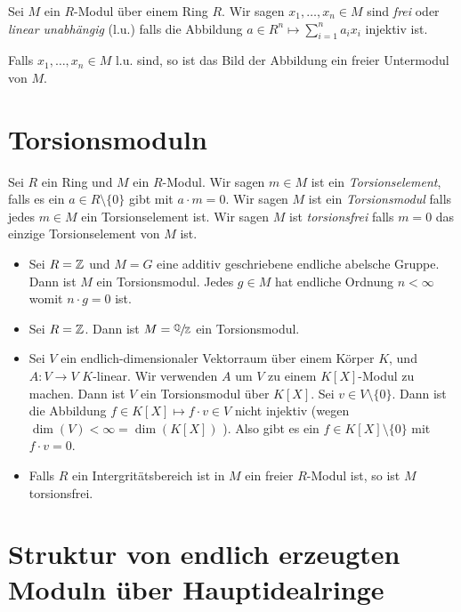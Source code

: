 \begin{definition}
	Sei $M$ ein $ R$-Modul über einem Ring $R$. Wir sagen $x_1,\ldots,x_{n} \in M$ sind \emph{frei} oder \emph{linear unabhängig} (l.u.) falls die Abbildung
	$a \in R^{n} \mapsto \sum_{i = 1}^{n} a_{i} x_{i}$ injektiv ist.

	Falls $x_1,\ldots,x_{n} \in M$ l.u. sind, so ist das Bild der Abbildung ein freier Untermodul von $M$.
\end{definition}

\section{Torsionsmoduln}
\begin{definition}
	Sei $R$ ein Ring und $M$ ein $R$-Modul. Wir sagen $m \in M$ ist ein \emph{Torsionselement}, falls es ein $a \in R \setminus \{0\} $ gibt
	mit $a \cdot m = 0$. Wir sagen $M$ ist ein \emph{Torsionsmodul} falls jedes $m \in M$ ein Torsionselement ist.
	Wir sagen $M$ ist \emph{torsionsfrei} falls $m = 0$ das einzige Torsionselement von $M$ ist.
\end{definition}

\begin{eg}
	\begin{itemize}
		\item Sei $R = \mathbb{Z}$ und $M = G$ eine additiv geschriebene endliche abelsche Gruppe. Dann ist $M$ ein Torsionsmodul.
			Jedes $g \in M$ hat endliche Ordnung $n < \infty$ womit $n \cdot g = 0$ ist.
		\item Sei $R = \mathbb{Z}$. Dann ist $M = \sfrac{\mathbb{Q}}{\mathbb{Z}}$ ein Torsionsmodul.
		\item Sei $V$ ein endlich-dimensionaler Vektorraum über einem Körper $K$, und $A : V \to V$ $K$-linear.
			Wir verwenden $A$ um $V$ zu einem $K[X]$-Modul zu machen. Dann ist $V$ ein Torsionsmodul über $K[X]$.
			Sei $v \in V \setminus \{0\} $. Dann ist die Abbildung $f \in K[X] \mapsto f \cdot v \in V$
			nicht injektiv (wegen $\dim(V) < \infty = \dim(K[X])$ ).
			Also gibt es ein $f \in K[X] \setminus \{0\} $ mit $f \cdot v = 0$.
		\item Falls $R$ ein Intergritätsbereich ist in $M$ ein freier $R$-Modul ist, so ist $M$ torsionsfrei.
	\end{itemize}
\end{eg}

\section{Struktur von endlich erzeugten Moduln über Hauptidealringe}

